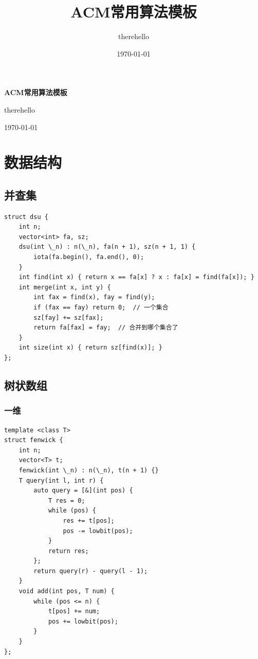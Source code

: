 \documentclass[UTF8]{ctexart}
\title{ACM常用算法模板}
\author{therehello}
\date{\today}
\newcommand\blankpage{
    \null
    \thispagestyle{empty}
    \addtocounter{page}{-1}
    \newpage
}
\begin{document}
\begin{sloppypar}

\begin{titlepage}
    \centering
    {\fontsize{40pt}{0pt}\selectfont \textbf{ACM常用算法模板}\par} %
    \vfill %
    {\fontsize{12pt}{0pt}\selectfont therehello\par} %
    \today %
\end{titlepage}

\blankpage

\tableofcontents

\clearpage

\section{数据结构}

\subsection{并查集}

\begin{lstlisting}[style=cpp]
struct dsu {
    int n;
    vector<int> fa, sz;
    dsu(int \_n) : n(\_n), fa(n + 1), sz(n + 1, 1) {
        iota(fa.begin(), fa.end(), 0);
    }
    int find(int x) { return x == fa[x] ? x : fa[x] = find(fa[x]); }
    int merge(int x, int y) {
        int fax = find(x), fay = find(y);
        if (fax == fay) return 0;  // 一个集合
        sz[fay] += sz[fax];
        return fa[fax] = fay;  // 合并到哪个集合了
    }
    int size(int x) { return sz[find(x)]; }
};
\end{lstlisting}

\subsection{树状数组}

\subsubsection{一维}

\begin{lstlisting}[style=cpp]
template <class T>
struct fenwick {
    int n;
    vector<T> t;
    fenwick(int \_n) : n(\_n), t(n + 1) {}
    T query(int l, int r) {
        auto query = [&](int pos) {
            T res = 0;
            while (pos) {
                res += t[pos];
                pos -= lowbit(pos);
            }
            return res;
        };
        return query(r) - query(l - 1);
    }
    void add(int pos, T num) {
        while (pos <= n) {
            t[pos] += num;
            pos += lowbit(pos);
        }
    }
};
\end{lstlisting}


\end{sloppypar}
\end{document}
